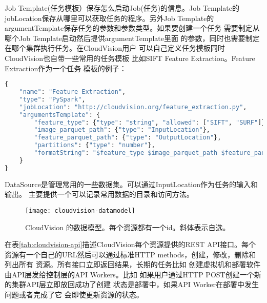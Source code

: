 Job Template(任务模板）保存怎么启动Job(任务)的信息。Job Template的
jobLocation保存从哪里可以获取任务的程序。另外Job Template的
argumentTemplate保存任务的参数和参数类型。如果要创建一个任务
需要制定从哪个Job Template启动然后提供argumentTemplate里面
的参数，同时也需要制定在哪个集群执行任务。在CloudVision用户
可以自己定义任务模板同时CloudVision也自带一些常用的任务模板
比如SIFT Feature Extraction。Feature Extraction作为一个任务
模板的例子：
\begin{lstlisting}[language=Python,basicstyle=\tiny,showstringspaces=false]
{
    "name": "Feature Extraction",
    "type": "PySpark",
    "jobLocation": "http://cloudvision.org/feature_extraction.py",
    "argumentsTemplate": {
        "feature_type": {"type": "string", "allowed": ["SIFT", "SURF"]},
        "image_parquet_path": {"type": "InputLocation"},
        "feature_parquet_path": {"type": "OutputLocation"},
        "partitions": {"type": "number"},
        "formatString": "$feature_type $image_parquet_path $feature_parquet_path $partitions"
    }
}
\end{lstlisting}

DataSource是管理常用的一些数据集。可以通过InputLocation作为任务的输入和输出。
主要提供一个可以记录常用数据的目录和访问方法。

\begin{figure}[h]
  \centering
    \texttt{[image: cloudvision-datamodel]}
  \caption{CloudVision 的数据模型。每个资源都有一个id。斜体表示自选。}
  \label{fig:cloudvision-datamodel}
\end{figure}

在表\ref{tab:cloudvision-api}描述CloudVision每个资源提供的REST API接口。每个
资源有一个自己的URL然后可以通过标准HTTP methods，创建，修改，删除和列出所有
资源。\cite{wiki:rest}所有接口立即返回结果，长期的任务比如
创建虚拟机和部署软件由API层发给控制层的API Workers。比如
如果用户通过HTTP POST创建一个新的集群API层立即放回成功了创建
状态是部署中，如果API Worker在部署中发生问题或者完成了它
会即使更新资源的状态。

